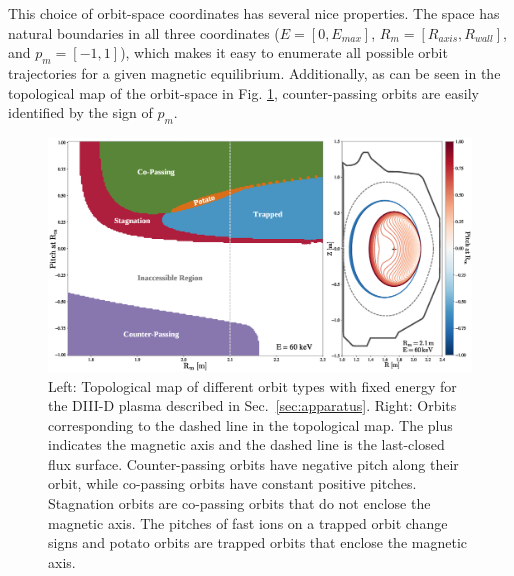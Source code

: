 This choice of orbit-space coordinates has several nice properties. The space has natural boundaries in all three coordinates ($E = [0,E_{max}]$, $R_m = [R_{axis},R_{wall}]$, and $p_m = [-1,1]$),
 which makes it easy to enumerate all possible orbit trajectories for a given magnetic equilibrium.
Additionally, as can be seen in the topological map of the orbit-space in Fig. \ref{fig:orbit_topology}, counter-passing orbits are easily identified by the sign of $p_m$.
\begin{figure}[ht]
    \centering
    \includegraphics[width=15cm]{figures/orbit_topology3.eps}
    \caption{Left: Topological map of different orbit types \cite{WHITE} with fixed energy
for the DIII-D plasma described in Sec.~\ref{sec:apparatus}.
 \newline Right: Orbits corresponding to the dashed line in the topological map. The
plus indicates the magnetic axis and the dashed line is the last-closed flux surface. Counter-passing orbits have negative pitch along their orbit, while co-passing orbits have constant positive pitches. Stagnation orbits are co-passing orbits that do not enclose the magnetic axis. The pitches of fast ions on a trapped orbit change signs and potato orbits are trapped orbits that enclose the magnetic axis.}
    \label{fig:orbit_topology}
\end{figure}

